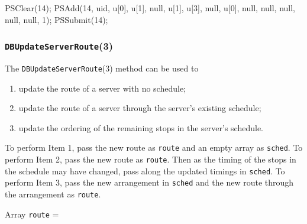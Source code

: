 \documentclass{article}
\def\nwendcode{\endtrivlist \endgroup}
\let\nwdocspar=\par
\theoremstyle{definition}
\begin{document}
\nwenddocs{}\endmoddef{}
PSClear(14);
PSAdd(14, uid, u[0], u[1], null, u[1], u[3], null, u[0],
    null, null, null, null, null, 1);
PSSubmit(14);
\nwendcode{}\nwdocspar

\subsubsection{{\tt{}\protect{}DBUpdateServerRoute}(3)}
The {\tt{}\protect{}DBUpdateServerRoute}(3) method can be used to
\begin{enumerate}
\item update the route of a server with no schedule;
\item update the route of a server through the server's existing schedule;
\item update the ordering of the remaining stops in the server's schedule.
\end{enumerate}
To perform Item 1, pass the new route as {\tt{}route} and an empty array as
{\tt{}sched}. To perform Item 2, pass the new route as {\tt{}route}. Then as the
timing of the stops in the schedule may have changed, pass along the updated
timings in {\tt{}sched}. To perform Item 3, pass the new arrangement in {\tt{}sched}
and the new route through the arrangement as {\tt{}route}.

Array {\tt{}route} =

\noindent
{}
\end{document}
